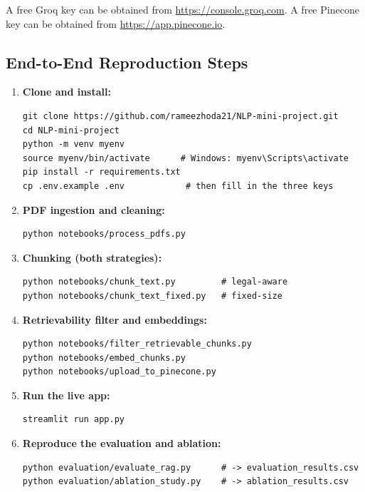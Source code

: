\documentclass[11pt,a4paper]{article}
\begin{document}
A free Groq key can be obtained from \url{https://console.groq.com}. A free Pinecone key can be obtained from \url{https://app.pinecone.io}.

\subsection{End-to-End Reproduction Steps}

\begin{enumerate}[leftmargin=*]
    \item \textbf{Clone and install:}
\begin{lstlisting}[language=promptlang]
git clone https://github.com/rameezhoda21/NLP-mini-project.git
cd NLP-mini-project
python -m venv myenv
source myenv/bin/activate      # Windows: myenv\Scripts\activate
pip install -r requirements.txt
cp .env.example .env            # then fill in the three keys
\end{lstlisting}

    \item \textbf{PDF ingestion and cleaning:}
\begin{lstlisting}[language=promptlang]
python notebooks/process_pdfs.py
\end{lstlisting}

    \item \textbf{Chunking (both strategies):}
\begin{lstlisting}[language=promptlang]
python notebooks/chunk_text.py         # legal-aware
python notebooks/chunk_text_fixed.py   # fixed-size
\end{lstlisting}

    \item \textbf{Retrievability filter and embeddings:}
\begin{lstlisting}[language=promptlang]
python notebooks/filter_retrievable_chunks.py
python notebooks/embed_chunks.py
python notebooks/upload_to_pinecone.py
\end{lstlisting}

    \item \textbf{Run the live app:}
\begin{lstlisting}[language=promptlang]
streamlit run app.py
\end{lstlisting}

    \item \textbf{Reproduce the evaluation and ablation:}
\begin{lstlisting}[language=promptlang]
python evaluation/evaluate_rag.py      # -> evaluation_results.csv
python evaluation/ablation_study.py    # -> ablation_results.csv
\end{lstlisting}
\end{enumerate}
\end{document}
